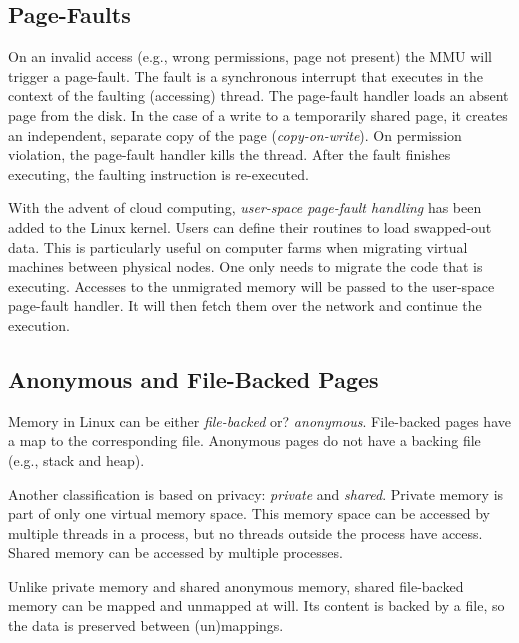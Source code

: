 \subsection{Page-Faults}
\label{subsec:pagefaults}
On an invalid access (e.g., wrong permissions, page not present) the MMU will
trigger a page-fault. The fault is a synchronous interrupt that executes in the
context of the faulting (accessing) thread. The page-fault handler loads an
absent page from the disk. In the case of a write to a temporarily shared page,
it creates an independent, separate copy of the page (\emph{copy-on-write}). On
permission violation, the page-fault handler kills the thread. After the fault
finishes executing, the faulting instruction is re-executed. 

With the advent of cloud computing, \emph{user-space page-fault handling} has
been added to the Linux kernel. Users can define their routines to load
swapped-out data. This is particularly useful on computer farms when migrating
virtual machines between physical nodes. One only needs to migrate the code that
is executing. Accesses to the unmigrated memory will be passed to the user-space
page-fault handler. It will then fetch them over the network and continue the
execution.

\subsection{Anonymous and File-Backed Pages}
\label{subsec:anofilepages}

Memory in Linux can be either \emph{file-backed} or? \emph{anonymous}.
File-backed pages have a map to the corresponding file. Anonymous pages do not
have a backing file (e.g., stack and heap).

Another classification is based on privacy: \emph{private} and \emph{shared}. 
Private memory is part of only one virtual memory space. This memory space can 
be accessed by multiple threads in a process, but no threads outside the process
have access. Shared memory can be accessed by multiple processes.

Unlike private memory and shared anonymous memory, shared file-backed memory can
be mapped and unmapped at will. Its content is backed by a file, so the data is 
preserved between (un)mappings.

